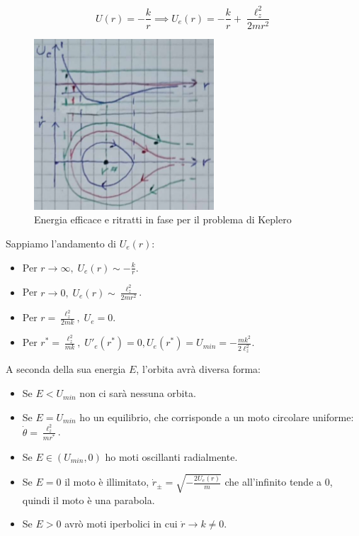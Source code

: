 \begin{example}
    \begin{equation}
        U(r )= -\frac{k}{r}\implies U_e(r )= -\frac{k}{r}+\frac{\ell_z^2}{2mr^2}
    \end{equation}

    \begin{figure}[h]
        \centering
        \includegraphics[width=0.6\textwidth]{images/orbitaKeplero.png}
        \caption{Energia efficace e ritratti in fase per il problema di Keplero}
    \end{figure}
    
    Sappiamo l'andamento di $U_e (r )$:
    \begin{itemize}
        \item Per $r\rightarrow \infty, \; U_e(r )\sim -\frac{k}{r}$.
        \item Per $r\rightarrow 0,\; U_e (r ) \sim \frac{\ell_z^2}{2mr^2}$.
        \item Per $r = \frac{\ell_z^2}{2mk},\;  U_e = 0$.
        \item Per $r^*= \frac{\ell_z^2}{mk},\; U'_e(r^*)=0, U_e(r^*)= U_{min}=-\frac{mk^2}{2\ell_z^2}$.
    \end{itemize}

    A seconda della sua energia $E$, l'orbita avrà diversa forma:
    \begin{itemize}
        \item Se $E<U_{min}$ non ci sarà nessuna orbita.
        \item Se $E= U_{min}$ ho un equilibrio, che corrisponde a un moto circolare uniforme: $\dot{\theta}=\frac{\ell_z^2}{mr^*}$.
        \item Se $E\in (U_{min},0)$ ho moti oscillanti radialmente.
        \item Se $E=0 $ il moto è illimitato, $\dot{r}_\pm= \sqrt{-\frac{2U_e(r )}{m }}$ che all'infinito tende a $0$, quindi il moto è una parabola.
        \item Se $E>0$ avrò moti iperbolici in cui $\dot{r}\rightarrow k \neq 0$.
    \end{itemize}

\end{example}


